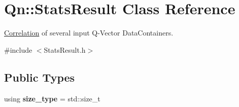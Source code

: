 \hypertarget{classQn_1_1StatsResult}{}\section{Qn\+:\+:Stats\+Result Class Reference}
\label{classQn_1_1StatsResult}


\mbox{\hyperlink{classQn_1_1Correlation}{Correlation}} of several input Q-\/\+Vector Data\+Containers.  




{\ttfamily \#include $<$Stats\+Result.\+h$>$}

\subsection*{Public Types}
\begin{DoxyCompactItemize}
\item 
\mbox{\label{classQn_1_1StatsResult_ae30a0e160c790393d174a9e5765bf41e}} 
using {\bfseries size\+\_\+type} = std\+::size\+\_\+t
\end{DoxyCompactItemize}
